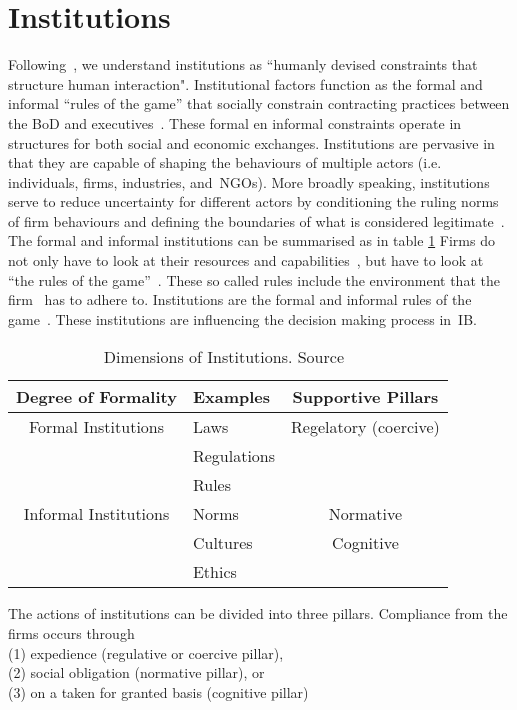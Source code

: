\section{Institutions}\label{sec:InTh}


Following~\cite{North:1990}, we understand institutions as ``humanly devised constraints that structure human interaction". 
Institutional factors function as the formal and informal ``rules of the game'' that socially constrain contracting practices between the \gls{BoD} and executives~\cite{North:1990}.
These formal en informal constraints operate in structures for both social and economic exchanges. 
Institutions are pervasive in that they are capable of shaping the behaviours of multiple actors (i.e. 
individuals, firms, industries, and~\glspl{NGO}). 
More broadly speaking, institutions serve to reduce uncertainty for different actors by conditioning the ruling norms of firm behaviours and defining the boundaries of what is considered legitimate~\cite{Peng:2008}.\\
The formal and informal institutions can be summarised as in table \ref{tab:peng2008}
Firms do not only have to look at their resources and capabilities~\cite{Barney:1991}, but have to look at ``the rules of the game''~\cite{Scott:1995}. 
These so called rules include the environment that the firm \mne~has to adhere to.
Institutions are the formal and informal rules of the game~\cite{North:1990}. These institutions are influencing the decision making process in~\gls{IB}.

\begin{table}[htb]
  \centering
  \caption{Dimensions of Institutions. Source~\cite{Peng:2008b}}
  \label{tab:peng2008}
\begin{tabular}{|c|l|c|} \hline
  Degree of Formality & Examples & Supportive Pillars\\ \hline \hline
  Formal Institutions& Laws&  Regelatory (coercive)\\
  &Regulations&\\
  &Rules&\\
  Informal Institutions&Norms &Normative \\
  & Cultures&Cognitive\\
  &Ethics&\\ \hline
\end{tabular}
\end{table}

\noindent
The actions of institutions can be divided into three pillars. 
Compliance from the firms occurs through \\
(1) expedience (regulative or coercive pillar),\\
(2) social obligation (normative pillar), or \\
(3) on a taken for granted basis (cognitive pillar) \\
 
